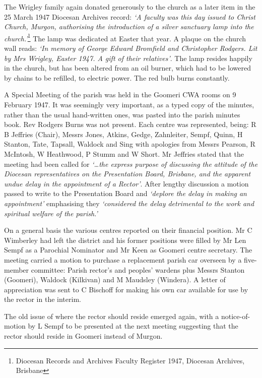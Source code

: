 The Wrigley family again donated generously to the church as a later item in the 25 March 1947 Diocesan Archives record: \emph{`A faculty was this day issued to Christ Church, Murgon, authorising the introduction of a silver sanctuary lamp into the church.'}\footnote{Diocesan Records and Archives Faculty Register 1947, Diocesan Archives, Brisbane} The lamp was dedicated at Easter that year. A plaque on the church wall reads: \emph{`In memory of George Edward Bromfield and Christopher Rodgers. Lit by Mrs Wrigley, Easter 1947. A gift of their relatives'}. The lamp resides happily in the church, but has been altered from an oil burner, which had to be lowered by chains to be refilled, to electric power. The red bulb burns constantly.


A Special Meeting of the parish was held in the Goomeri CWA rooms on 9 February 1947. It was seemingly very important, as a typed copy of the minutes, rather than the usual hand-written ones, was pasted into the parish minutes book. Rev Rodgers Burns was not present. Each centre was represented, being: R B Jeffries (Chair), Messrs Jones, Atkins, Gedge, Zahnleiter, Sempf, Quinn, H Stanton, Tate, Tapsall, Waldock and Sing with apologies from Messrs Pearson, R McIntosh, W Heathwood, P Stumm and W Short. Mr Jeffries stated that the meeting had been called for \emph{`\ldots the express purpose of discussing the attitude of the Diocesan representatives on the Presentation Board, Brisbane, and the apparent undue delay in the appointment of a Rector'}. After lengthy discussion a motion passed to write to the Presentation Board and \emph{`deplore the delay in making an appointment'} emphasising they \emph{`considered the delay detrimental to the work and spiritual welfare of the parish.'}



On a general basis the various centres reported on their financial position. Mr C Wimberley had left the district and his former positions were filled by Mr Len Sempf as a Parochial Nominator and Mr Keen as Goomeri centre secretary. The meeting carried a motion to purchase a replacement parish car overseen by a five-member committee: Parish rector's and peoples' wardens plus Messrs Stanton (Goomeri), Waldock (Kilkivan) and M Maudsley (Windera). A letter of appreciation was sent to C Bischoff for making his own car available for use by the rector in the interim.



The old issue of where the rector should reside emerged again, with a notice-of-motion by L Sempf to be presented at the next meeting suggesting that the rector should reside in Goomeri instead of Murgon.



